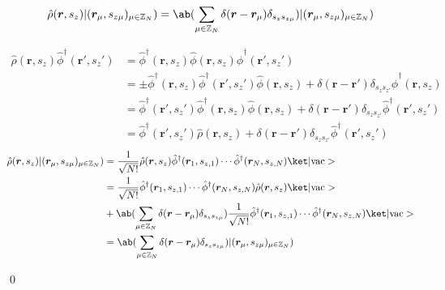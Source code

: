 \documentclass[uplatex,dvipdfmx,a4paper,11pt]{jlreq}
\makeatletter
\newcommand{\ZZ}{\mathbb{Z}}
\newcommand{\rr}{\bm{r}}
\numberwithin{equation}{section}
\theoremstyle{definition}
\renewenvironment{proof}[1][\proofname]{\par
  \normalfont
  \topsep6\p@\@plus6\p@ \trivlist
  \item[\hskip\labelsep{\bfseries #1}\@addpunct{\bfseries}]\ignorespaces\quad\par
}{
  \qed\endtrivlist\@endpefalse
}
\renewcommand\proofname{証明}
\makeatother
\begin{document}
\begin{theorem}
  \begin{align}
    \hat{\rho}(\rr, s_z)|(\rr_\mu, s_{z\mu})_{\mu\in\ZZ_N}) = \ab(\sum_{\mu\in\ZZ_N}\delta(\rr - \rr_\mu)\delta_{s_zs_{z\mu}})|(\rr_\mu, s_{z\mu})_{\mu\in\ZZ_N})
  \end{align}
\end{theorem}
\begin{proof}
  \begin{align}
    \hat{\rho}(\rr, s_z)\hat{\phi}^\dagger(\rr', s_z') & = \hat{\phi}^\dagger(\rr, s_z)\hat{\phi}(\rr, s_z)\hat{\phi}^\dagger(\rr', s_z')                                                                       \\
                                                       & = \pm\hat{\phi}^\dagger(\rr, s_z)\hat{\phi}^\dagger(\rr', s_z')\hat{\phi}(\rr, s_z) + \delta(\rr - \rr')\delta_{s_zs_{z'}}\hat{\phi}^\dagger(\rr, s_z) \\
                                                       & = \hat{\phi}^\dagger(\rr', s_z')\hat{\phi}^\dagger(\rr, s_z)\hat{\phi}(\rr, s_z) + \delta(\rr - \rr')\delta_{s_zs_{z'}}\hat{\phi}^\dagger(\rr', s_z')  \\
                                                       & = \hat{\phi}^\dagger(\rr', s_z')\hat{\rho}(\rr, s_z) + \delta(\rr - \rr')\delta_{s_zs_{z'}}\hat{\phi}^\dagger(\rr', s_z')
  \end{align}
  \begin{align}
    \hat{\rho}(\rr, s_z)|(\rr_\mu, s_{z\mu})_{\mu\in\ZZ_N}) & = \frac{1}{\sqrt{N!}}\hat{\rho}(\rr, s_z)\hat{\phi}^\dagger(\rr_1, s_{z,1})\cdots\hat{\phi}^\dagger(\rr_N, s_{z,N})\ket|\mathrm{vac}>                                             \\
                                                            & = \frac{1}{\sqrt{N!}}\hat{\phi}^\dagger(\rr_1, s_{z,1})\cdots\hat{\phi}^\dagger(\rr_N, s_{z,N})\hat{\rho}(\rr, s_z)\ket|\mathrm{vac}>                                             \\
                                                            & + \ab(\sum_{\mu\in\ZZ_N}\delta(\rr - \rr_\mu)\delta_{s_zs_{z\mu}})\frac{1}{\sqrt{N!}}\hat{\phi}^\dagger(\rr_1, s_{z,1})\cdots\hat{\phi}^\dagger(\rr_N, s_{z,N})\ket|\mathrm{vac}> \\
                                                            & = \ab(\sum_{\mu\in\ZZ_N}\delta(\rr - \rr_\mu)\delta_{s_zs_{z\mu}})|(\rr_\mu, s_{z\mu})_{\mu\in\ZZ_N})
  \end{align}
\end{proof}
\end{document}
